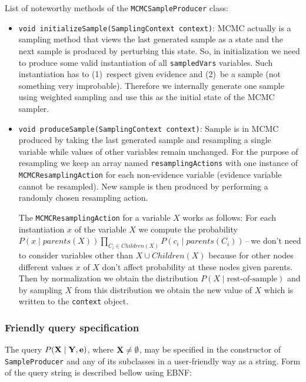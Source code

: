 \documentclass[english,cover]{fitthesis} %
\newcommand{\srccode}[1]{{\tt #1}}         %
\newcommand{\vars}[1]{{\bold{#1}}}         %
\begin{document}
\medskip
List of noteworthy methods of the \srccode{MCMCSampleProducer} class:
\begin{itemize}
	\item \srccode{void initializeSample(SamplingContext context)}: MCMC actually is a sampling method that views the last generated sample as a state and the next sample is produced by perturbing this state. So, in initialization we need to produce some valid instantiation of all \srccode{sampledVars} variables. Such instantiation has to (1)~respect given evidence and (2)~be a  sample (not something very improbable). Therefore we internally generate one sample using weighted sampling and use this as the initial state of the MCMC sampler.
	\item \srccode{void produceSample(SamplingContext context)}: Sample is in MCMC produced by taking the last generated sample and resampling a single variable while values of other variables remain unchanged. For the purpose of resampling we keep an array named \srccode{resamplingActions} with one instance of \srccode{MCMCResamplingAction} for each non-evidence variable (evidence variable cannot be resampled). New sample is then produced by performing a randomly chosen resampling action.
	
	The \srccode{MCMCResamplingAction} for a variable $X$ works as follows: For each instantiation $x$ of the variable $X$ we compute the probability $P(x \mid parents(X)) \prod_{C_i \in Children(X)} P(c_i \mid parents(C_i))$\,--\,we don't need to consider variables other than $X \cup Children(X)$ because for other nodes different values $x$ of $X$ don't affect probability at these nodes given parents. Then by normalization we obtain the distribution $P(X \mid \text{rest-of-sample})$ and by sampling $X$ from this distribution we obtain the new value of $X$ which is written to the \srccode{context} object.
\end{itemize}


\subsubsection{Friendly query specification}
The query $P(\vars{X} \mid \vars{Y}, \vars{e})$, where $\vars{X} \neq \emptyset$, may be specified in the constructor of \srccode{SampleProducer} and any of its subclasses in a user-friendly way as a string. Form of the query string is described bellow using EBNF:
\end{document}
